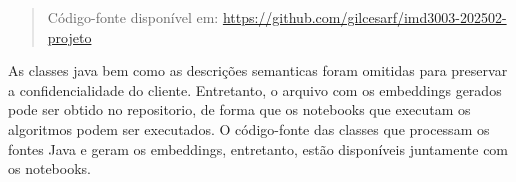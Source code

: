 \documentclass[12pt,a4paper]{article}
\begin{document}
\begin{quote}
Código-fonte disponível em: 
\newline
\url{https://github.com/gilcesarf/imd3003-202502-projeto}
\end{quote}

As classes java bem como as descrições semanticas foram omitidas para preservar a confidencialidade do cliente. Entretanto, o arquivo com os embeddings gerados pode ser obtido no repositorio, de forma que os notebooks que executam os algoritmos podem ser executados.
O código-fonte das classes que processam os fontes Java e geram os embeddings, entretanto, estão disponíveis juntamente com os notebooks.
\end{document}
